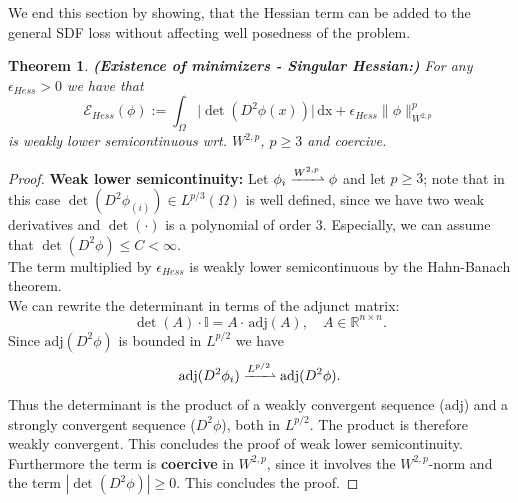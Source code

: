 \documentclass[12pt,openany]{book}
\newcommand{\R}{\mathbb{R}}
\def\S{\mathcal{S}}
\theoremstyle{plainnormal}
\newtheorem{theorem}{Theorem}[section]
\theoremstyle{remark}
\begin{document}
We end this section by showing, that the Hessian term can be added to the general SDF loss without affecting well posedness of the problem.
\begin{theorem}{\textbf{(Existence of minimizers - Singular Hessian:)}}
For any $\epsilon_{Hess} > 0$ we have that $$ \mathcal E_{Hess}(\phi) := \int_\Omega \big|\det(D^2 \phi(x))\big| \,\mathrm{dx} + \epsilon_{Hess} \|\phi\|_{W^{2,p}}^p $$%
is weakly lower semicontinuous wrt. $W^{2,p}$, $p\geq 3$ and coercive.
\end{theorem} 
\begin{proof}
    \textbf{Weak lower semicontinuity:} Let $\phi_i \xrightharpoonup{W^{2,p}} \phi$ and let $p \geq 3$; note that in this case $\det(D^2\phi_{(i)}) \in L^{p/3}(\Omega)$ is well defined, since we have two weak derivatives and $\det(\cdot)$ is a polynomial of order 3. Especially, we can assume that $\det(D^2\phi) \leq C < \infty$. \\ 
    The term multiplied by $\epsilon_{Hess}$ is weakly lower semicontinuous by the Hahn-Banach theorem.\\
    We can rewrite the determinant in terms of the adjunct matrix:
    $$\det(A) \cdot \mathbb I = A\cdot \,\mathrm{adj}(A), \quad A\in\R^{n\times n}.$$
    Since $\mathrm{adj}(D^2\phi)$ is bounded in $L^{p/2}$ we have  $$\mathrm{adj}(D^2 \phi_i) \xrightharpoonup{L^{p/2}}\mathrm{adj}(D^2 \phi). $$
    Thus the determinant is the product of a weakly convergent sequence ($\mathrm{adj}$) and a strongly convergent sequence ($D^2\phi$), both in $L^{p/2}$. The product is therefore weakly convergent. This concludes the proof of weak lower semicontinuity. \\
    Furthermore the term is \textbf{coercive} in $W^{2,p}$, since it involves the $W^{2,p}$-norm and the term $|\det(D^2\phi)|\geq 0$. This concludes the proof.
    

\end{proof}
\end{document}
